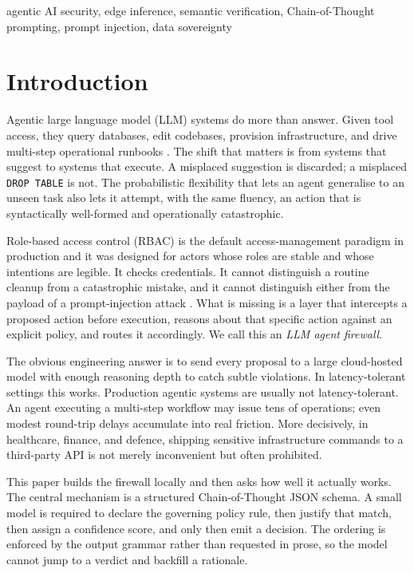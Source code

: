 \documentclass[journal,onecolumn,12pt]{IEEEtran}
\begin{document}
\begin{IEEEkeywords}
agentic AI security, edge inference, semantic verification, Chain-of-Thought prompting, prompt injection, data sovereignty
\end{IEEEkeywords}

\section{Introduction}

Agentic large language model (LLM) systems do more than answer. Given tool access, they query databases, edit codebases, provision infrastructure, and drive multi-step operational runbooks \cite{brown2020,ouyang2022,schick2023,yao2023,wu2023,park2023}. The shift that matters is from systems that suggest to systems that execute. A misplaced suggestion is discarded; a misplaced \texttt{DROP TABLE} is not. The probabilistic flexibility that lets an agent generalise to an unseen task also lets it attempt, with the same fluency, an action that is syntactically well-formed and operationally catastrophic.

Role-based access control (RBAC) is the default access-management paradigm in production and it was designed for actors whose roles are stable and whose intentions are legible. It checks credentials. It cannot distinguish a routine cleanup from a catastrophic mistake, and it cannot distinguish either from the payload of a prompt-injection attack \cite{greshake2023}. What is missing is a layer that intercepts a proposed action before execution, reasons about that specific action against an explicit policy, and routes it accordingly. We call this an \emph{LLM agent firewall}.

The obvious engineering answer is to send every proposal to a large cloud-hosted model with enough reasoning depth to catch subtle violations. In latency-tolerant settings this works. Production agentic systems are usually not latency-tolerant. An agent executing a multi-step workflow may issue tens of operations; even modest round-trip delays accumulate into real friction. More decisively, in healthcare, finance, and defence, shipping sensitive infrastructure commands to a third-party API is not merely inconvenient but often prohibited.

This paper builds the firewall locally and then asks how well it actually works. The central mechanism is a structured Chain-of-Thought JSON schema. A small model is required to declare the governing policy rule, then justify that match, then assign a confidence score, and only then emit a decision. The ordering is enforced by the output grammar rather than requested in prose, so the model cannot jump to a verdict and backfill a rationale.
\end{document}
